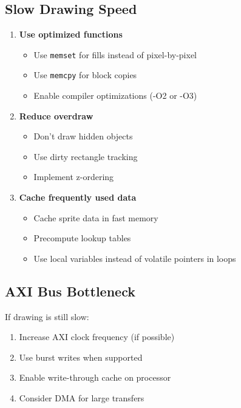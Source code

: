\documentclass[11pt,letterpaper]{report}
\begin{document}
\subsection{Slow Drawing Speed}

\begin{enumerate}
    \item \textbf{Use optimized functions}
    \begin{itemize}
        \item Use \texttt{memset} for fills instead of pixel-by-pixel
        \item Use \texttt{memcpy} for block copies
        \item Enable compiler optimizations (-O2 or -O3)
    \end{itemize}
    
    \item \textbf{Reduce overdraw}
    \begin{itemize}
        \item Don't draw hidden objects
        \item Use dirty rectangle tracking
        \item Implement z-ordering
    \end{itemize}
    
    \item \textbf{Cache frequently used data}
    \begin{itemize}
        \item Cache sprite data in fast memory
        \item Precompute lookup tables
        \item Use local variables instead of volatile pointers in loops
    \end{itemize}
\end{enumerate}

\subsection{AXI Bus Bottleneck}

If drawing is still slow:

\begin{enumerate}
    \item Increase AXI clock frequency (if possible)
    \item Use burst writes when supported
    \item Enable write-through cache on processor
    \item Consider DMA for large transfers
\end{enumerate}
\end{document}
